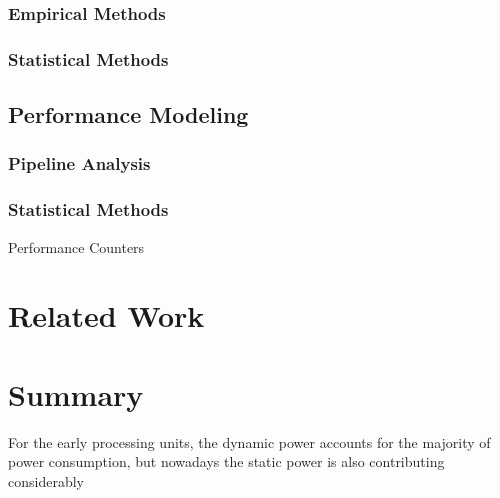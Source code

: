 \subsubsection{Empirical Methods}
\subsubsection{Statistical Methods}

\subsection{Performance Modeling}
\label{section:powermodels}
\subsubsection{Pipeline Analysis}
\subsubsection{Statistical Methods}
Performance Counters

\section{Related Work}

\section{Summary}


For the early processing units, the dynamic power accounts for the majority of power consumption, but nowadays the static power is also contributing considerably